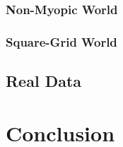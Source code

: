 \documentclass[10pt,twoside]{report}
\begin{document}
        \subsection{Non-Myopic World}
        \subsection{Square-Grid World}
    \section{Real Data}

\chapter{Conclusion}\label{ref:conclusion}

\nocite{*}




\end{document}
